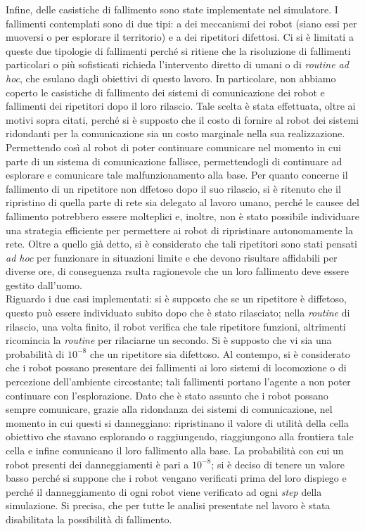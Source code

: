Infine,  delle casistiche di fallimento sono state implementate nel simulatore.
I fallimenti contemplati sono di due tipi: a dei meccanismi dei robot (siano essi per muoversi o per esplorare il territorio) e a dei ripetitori difettosi.
Ci si è limitati a queste due tipologie di fallimenti perché si ritiene che la risoluzione di fallimenti particolari o più sofisticati richieda l'intervento diretto di umani o di \textit{routine ad hoc}, che esulano dagli obiettivi di questo lavoro.
In particolare, non abbiamo coperto le casistiche di fallimento dei sistemi di comunicazione dei robot e fallimenti dei ripetitori dopo il loro rilascio.
Tale scelta è stata effettuata, oltre ai motivi sopra citati, perché si è supposto che il costo di fornire al robot dei sistemi ridondanti per la comunicazione sia un costo marginale nella sua realizzazione. 
Permettendo così al robot di poter continuare comunicare nel momento in cui parte di un sistema di comunicazione fallisce, permettendogli di continuare ad esplorare e comunicare tale malfunzionamento alla base.
Per quanto concerne il fallimento di un ripetitore non dffetoso dopo il suo rilascio, si è ritenuto che il ripristino di quella parte di rete sia delegato al lavoro umano, perché le causee del fallimento potrebbero essere molteplici e, inoltre, non è stato possibile individuare una strategia efficiente per permettere ai robot di ripristinare autonomamente la rete.
Oltre a quello già detto, si è considerato che tali ripetitori sono stati pensati \textit{ad hoc} per funzionare in situazioni limite e che devono risultare affidabili \cite{OWL} per diverse ore, di conseguenza rsulta ragionevole che un loro fallimento deve essere gestito dall'uomo.\\
Riguardo i due casi implementati: si è supposto che se un ripetitore è diffetoso, questo può essere individuato subito dopo che è stato rilasciato; nella \textit{routine} di rilascio, una volta finito, il robot verifica che tale ripetitore funzioni, altrimenti ricomincia la \textit{routine} per rilaciarne un secondo.
Si è supposto che vi sia una probabilità di $10^{-8}$ che un ripetitore sia difettoso.
Al contempo, si è considerato che i robot possano presentare dei fallimenti ai loro sistemi di locomozione o di percezione dell'ambiente circostante; tali fallimenti portano l'agente a non poter continuare con l'esplorazione.
Dato che è stato assunto che i robot possano sempre comunicare, grazie alla ridondanza dei sistemi di comunicazione, nel momento in cui questi si danneggiano: ripristinano il valore di utilità della cella obiettivo che stavano esplorando o raggiungendo, riaggiungono alla frontiera tale cella e infine comunicano il loro fallimento alla base.
La probabilità con cui un robot presenti dei danneggiamenti è pari a $10^{-8}$; si è deciso di tenere un valore basso perché si suppone che i robot vengano verificati prima del loro dispiego e perché il danneggiamento di ogni robot viene verificato ad ogni \textit{step} della simulazione.
Si precisa, che per tutte le analisi presentate nel lavoro è stata disabilitata la possibilità di fallimento.
